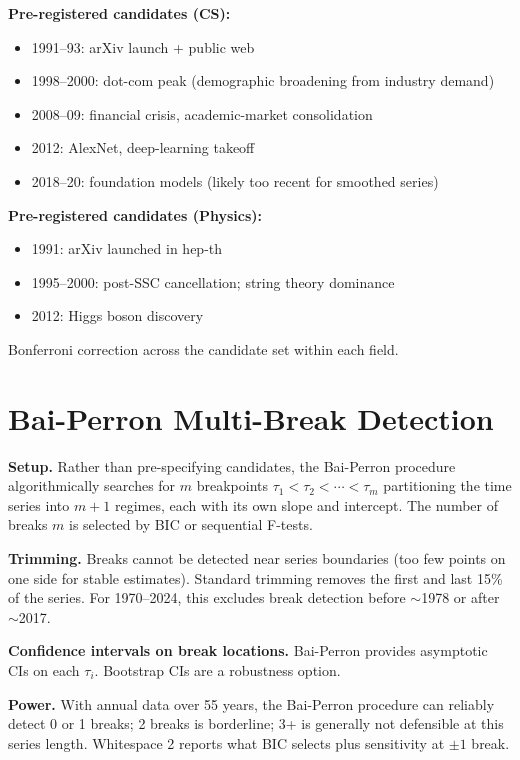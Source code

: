 \documentclass[11pt]{article}
\begin{document}
\textbf{Pre-registered candidates (CS):}
\begin{itemize}[nosep]
  \item 1991--93: arXiv launch + public web
  \item 1998--2000: dot-com peak (demographic broadening from industry
    demand)
  \item 2008--09: financial crisis, academic-market consolidation
  \item 2012: AlexNet, deep-learning takeoff
  \item 2018--20: foundation models (likely too recent for smoothed
    series)
\end{itemize}

\textbf{Pre-registered candidates (Physics):}
\begin{itemize}[nosep]
  \item 1991: arXiv launched in hep-th
  \item 1995--2000: post-SSC cancellation; string theory dominance
  \item 2012: Higgs boson discovery
\end{itemize}

Bonferroni correction across the candidate set within each field.

\section{Bai-Perron Multi-Break Detection}
\label{sec:bai-perron}

\textbf{Setup.} Rather than pre-specifying candidates, the Bai-Perron
procedure algorithmically searches for $m$ breakpoints
$\tau_1 < \tau_2 < \cdots < \tau_m$ partitioning the time series into
$m+1$ regimes, each with its own slope and intercept. The number of
breaks $m$ is selected by BIC or sequential F-tests.

\textbf{Trimming.} Breaks cannot be detected near series boundaries
(too few points on one side for stable estimates). Standard trimming
removes the first and last 15\% of the series. For 1970--2024, this
excludes break detection before $\sim$1978 or after $\sim$2017.

\textbf{Confidence intervals on break locations.} Bai-Perron provides
asymptotic CIs on each $\tau_i$. Bootstrap CIs are a robustness option.

\textbf{Power.} With annual data over 55 years, the Bai-Perron
procedure can reliably detect 0 or 1 breaks; 2 breaks is borderline;
3+ is generally not defensible at this series length. Whitespace 2
reports what BIC selects plus sensitivity at $\pm 1$ break.
\end{document}
